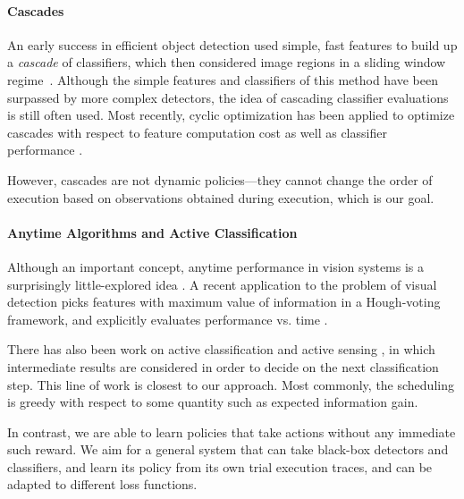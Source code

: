 \paragraph{Cascades}
An early success in efficient object detection used simple, fast features to build up a \emph{cascade} of classifiers, which then considered image regions in a sliding window regime~\cite{Viola2001}.
Although the simple features and classifiers of this method have been surpassed by more complex detectors, the idea of cascading classifier evaluations is still often used.
Most recently, cyclic optimization has been applied to optimize cascades with respect to feature computation cost as well as classifier performance \cite{Chen2012}.

However, cascades are not dynamic policies---they cannot change the order of execution based on observations obtained during execution, which is our goal.

\paragraph{Anytime Algorithms and Active Classification}
Although an important concept, anytime performance in vision systems is a surprisingly little-explored idea \cite{Shlomo Zilberstein}.
A recent application to the problem of visual detection picks features with maximum value of information in a Hough-voting framework, and explicitly evaluates performance vs. time \cite{Vijayanarasimhan2010}. 

There has also been work on active classification \cite{Gao2011} and active sensing \cite{Yu2009}, in which intermediate results are considered in order to decide on the next classification step.
This line of work is closest to our approach.
Most commonly, the scheduling is greedy with respect to some quantity such as expected information gain.

In contrast, we are able to learn policies that take actions without any immediate such reward.
We aim for a general system that can take black-box detectors and classifiers, and learn its policy from its own trial execution traces, and can be adapted to different loss functions.
